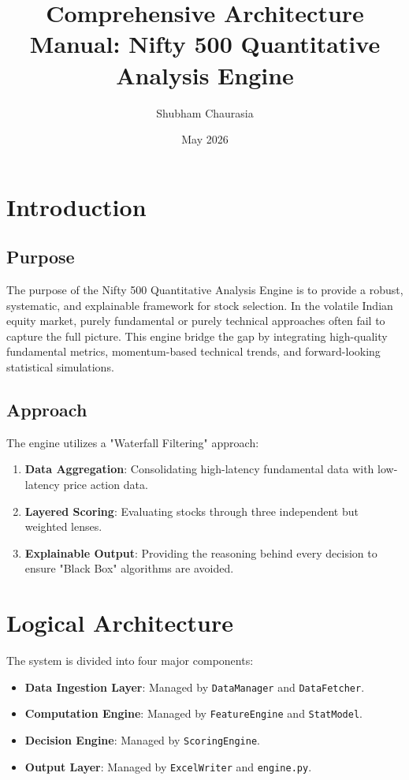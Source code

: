 \documentclass{article}
\title{Comprehensive Architecture Manual: Nifty 500 Quantitative Analysis Engine}
\author{Shubham Chaurasia}
\date{May 2026}
\begin{document}
\maketitle
\tableofcontents
\newpage

\section{Introduction}
\subsection{Purpose}
The purpose of the Nifty 500 Quantitative Analysis Engine is to provide a robust, systematic, and explainable framework for stock selection. In the volatile Indian equity market, purely fundamental or purely technical approaches often fail to capture the full picture. This engine bridge the gap by integrating high-quality fundamental metrics, momentum-based technical trends, and forward-looking statistical simulations.

\subsection{Approach}
The engine utilizes a "Waterfall Filtering" approach:
\begin{enumerate}
    \item \textbf{Data Aggregation}: Consolidating high-latency fundamental data with low-latency price action data.
    \item \textbf{Layered Scoring}: Evaluating stocks through three independent but weighted lenses.
    \item \textbf{Explainable Output}: Providing the reasoning behind every decision to ensure "Black Box" algorithms are avoided.
\end{enumerate}

\section{Logical Architecture}
The system is divided into four major components:
\begin{itemize}
    \item \textbf{Data Ingestion Layer}: Managed by \texttt{DataManager} and \texttt{DataFetcher}.
    \item \textbf{Computation Engine}: Managed by \texttt{FeatureEngine} and \texttt{StatModel}.
    \item \textbf{Decision Engine}: Managed by \texttt{ScoringEngine}.
    \item \textbf{Output Layer}: Managed by \texttt{ExcelWriter} and \texttt{engine.py}.
\end{itemize}
\end{document}
